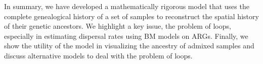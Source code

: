 In summary, we have developed a mathematically rigorous model that uses the complete genealogical history of a set of samples to reconstruct the spatial history of their genetic ancestors. We highlight a key issue, the problem of loops, especially in estimating dispersal rates using BM models on ARGs. Finally, we show the utility of the model in visualizing the ancestry of admixed samples and discuss alternative models to deal with the problem of loops. 



